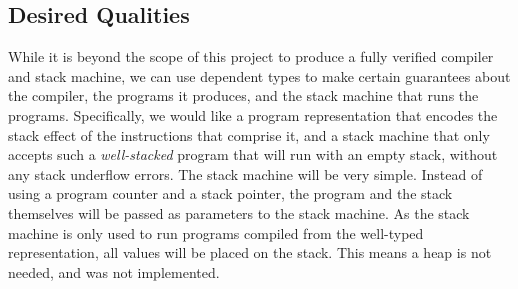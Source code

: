 \subsection{Desired Qualities}
While it is beyond the scope of this project to produce a fully verified compiler and stack machine, we can use dependent types to make certain guarantees about the compiler, the programs it produces, and the stack machine that runs the programs. Specifically, we would like a program representation that encodes the stack effect of the instructions that comprise it, and a stack machine that only accepts such a \textit{well-stacked} program that will run with an empty stack, without any stack underflow errors. The stack machine will be very simple. Instead of using a program counter and a stack pointer, the program and the stack themselves will be passed as parameters to the stack machine. As the stack machine is only used to run programs compiled from the well-typed representation, all values will be placed on the stack. This means a heap is not needed, and was not implemented.





